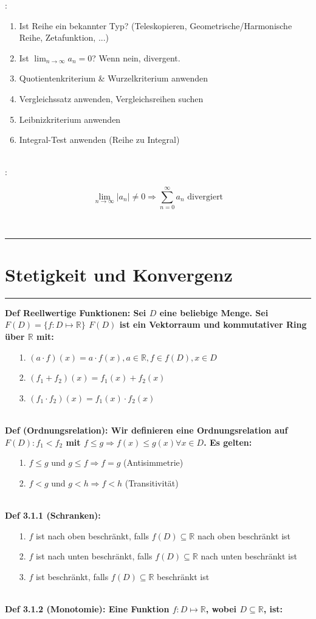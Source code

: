 \documentclass[7pt,landscape, margin = 0.1mm]{article}
\def\limn{\lim_{n\to \infty}}
\newcommand{\titellinie}{\rule{1.\linewidth}{0.75pt}}
\newcommand*{\mysection}[2][black]{\vskip 0pt \titellinie\vspace{-20pt}\section{#2}\vspace{-14pt}\titellinie \colorlet{chaptecolor}{#1}}
\newcommand{\KRZ}[2]{\vspace{1mm} \hline \vspace{1mm} \color{chaptercolor}{RC #1}:\color{black} \   \hspace{0.2cm}\vspace{1mm}   {\begin{minipage}{20em}
#2 \end{minipage}} \vspace{1mm}  \hline \vspace{1mm}  \\}
\newcommand{\DEF}[2]{\color{chaptercolor}\bf{Def #1}:\color{black}    \hspace{0.2cm} #2 \\}
\begin{document}
\begin{multicols}{4}
\begin{flushleft}
\KRZ{Konvergenz von Reihen}{\begin{enumerate}
 \item Ist Reihe ein bekannter Typ? (Teleskopieren, Geometrische/Harmonische Reihe, Zetafunktion, ...)
 \item Ist $\limn a_n = 0$? Wenn nein, divergent.
 \item Quotientenkriterium \& Wurzelkriterium anwenden
 \item Vergleichssatz anwenden, Vergleichsreihen suchen
 \item Leibnizkriterium anwenden
 \item Integral-Test anwenden (Reihe zu Integral)
\end{enumerate}}
\KRZ{Nullfolgen}{$$
  \lim_{n \rightarrow \infty} |a_n| \neq 0 \Rightarrow \sum_{n = 0}^\infty a_n \text{ divergiert}
$$}
\mysection[blue]{\centering Stetigkeit und Konvergenz}
\DEF{ Reellwertige Funktionen}{Sei $D$ eine beliebige Menge. Sei $F(D) = \{f:D\mapsto \mathbb{R}\}$
$F(D)$ ist ein Vektorraum und kommutativer Ring über $\mathbb{R}$ mit:
\begin{itemize}
\item[1.] $(a \cdot f)(x) = a \cdot f(x) , a \in \mathbb{R}, f \in f(D) , x \in D$
\item[2.] $ (f_1 + f_2)(x) = f_1(x) + f_2(x)$
\item[3.] $(f_1 \cdot f_2) (x) = f_1 (x) \cdot f_2(x)$ 
\end{itemize}
}
\DEF{ (Ordnungsrelation)}{ Wir definieren eine Ordnungsrelation auf $F(D): f_1 < f_2$ mit $f \leq g \Rightarrow f(x) \leq g(x) \forall x \in D$. Es gelten:
\begin{itemize}
\item[1.] $f \leq g$ und $g \leq f \Rightarrow f=g$ (Antisimmetrie)
\item[2.] $f < g$ und $g< h \Rightarrow f < h$ (Transitivität)
\end{itemize}
 }
 \DEF{3.1.1 (Schranken)}{ 
 \begin{itemize}
\item[1.]  $f$ ist nach oben beschränkt, falls $f(D) \subseteq \mathbb{R}$ nach oben beschränkt ist
\item[2.] $f$ ist nach unten beschränkt, falls $f(D) \subseteq \mathbb{R}$ nach unten beschränkt ist
\item[3.] $f$ ist beschränkt, falls $f(D) \subseteq \mathbb{R}$ beschränkt ist 

 \end{itemize}}
 \DEF{3.1.2 (Monotomie)}{  Eine Funktion $f: D\mapsto \mathbb{R}$, wobei $D \subseteq \mathbb{R}$, ist:
 \begin{itemize}
 


\end{itemize}}
\end{flushleft}
\end{multicols}
\end{document}
